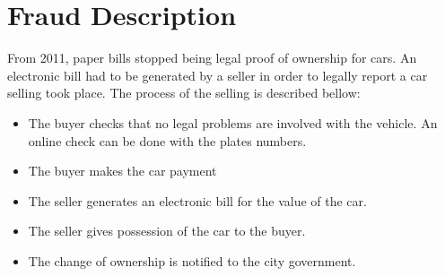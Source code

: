 \section{Fraud Description}
From 2011, paper bills stopped being legal proof of ownership for cars. An electronic bill had to be generated by a seller in order to legally report a car selling took place.
The process of the selling is described bellow:
\begin{itemize}
    \item The buyer checks that no legal problems are involved with the vehicle. An online check can be done with the plates numbers. 
    \item The buyer makes the car payment
    \item The seller generates an electronic bill for the value of the car.
    \item The seller gives possession of the car to the buyer.
    \item The change of ownership is notified to the city government.
\end{itemize}